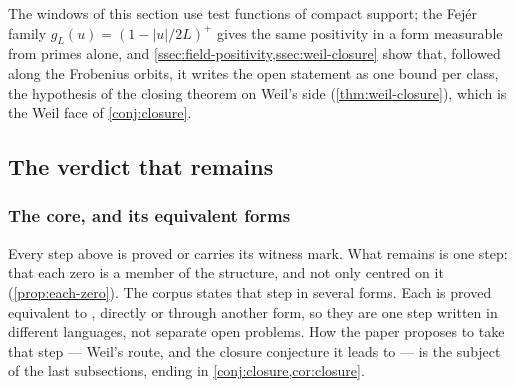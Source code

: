 The windows of this section use test functions of compact support; the Fej\'er family
$g_L(u)=(1-|u|/2L)^+$ gives the same positivity in a form measurable from primes alone, and
\cref{ssec:field-positivity,ssec:weil-closure} show that, followed along the Frobenius orbits, it writes the open statement as one bound per class, the hypothesis of the closing theorem on
Weil's side (\cref{thm:weil-closure}), which is the Weil face of \cref{conj:closure}.

\subsection{The verdict that remains}\label{sec:results-verdict}

\subsubsection{The core, and its equivalent forms}\label{ssec:core}\label{ssec:core-forms}

Every step above is proved or carries its witness mark.  What remains is one step: that each
zero is a member of the structure, and not only centred on it
(\cref{prop:each-zero}).  The corpus states that step in several forms.  Each is proved
equivalent to \Ecore, directly or through another form, so they are one step written
in different languages, not separate open problems.  How the paper proposes to take that step
--- Weil's route, and the closure conjecture it leads to --- is the subject of the last subsections,
ending in \cref{conj:closure,cor:closure}.

